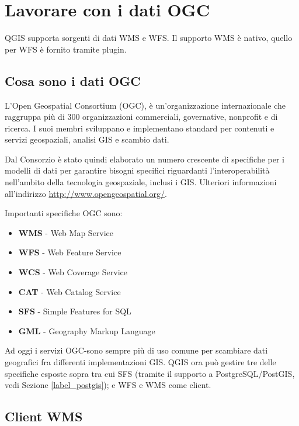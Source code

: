 
\section{Lavorare con i dati OGC}


QGIS supporta sorgenti di dati WMS e WFS. Il supporto WMS è nativo, quello per
WFS è fornito tramite plugin.

\subsection{Cosa sono i dati OGC}

L'Open Geospatial Consortium (OGC), è un’organizzazione internazionale che raggruppa più
di 300 organizzazioni commerciali, governative, nonprofit e di ricerca.
I suoi membri sviluppano e implementano standard per contenuti e servizi geospaziali,
analisi GIS e scambio dati.

Dal Consorzio è stato quindi elaborato un numero crescente di specifiche per i modelli di
dati per garantire bisogni specifici riguardanti l'interoperabilità
nell'ambito della tecnologia geospaziale, inclusi i GIS. Ulteriori
informazioni all'indirizzo \url{http://www.opengeospatial.org/}.

Importanti specifiche OGC sono:

\begin{itemize}
\item \textbf{WMS} - Web Map Service
\item \textbf{WFS} - Web Feature Service
\item \textbf{WCS} - Web Coverage Service
\item \textbf{CAT} - Web Catalog Service
\item \textbf{SFS} - Simple Features for SQL
\item \textbf{GML} - Geography Markup Language
\end{itemize}

Ad oggi i servizi OGC-sono sempre più di uso comune per scambiare dati geografici fra
differenti implementazioni GIS. QGIS ora può gestire tre delle specifiche esposte sopra
tra cui SFS (tramite il supporto a PostgreSQL/PostGIS, vedi Sezione
\ref{label_postgis}); e WFS e WMS come client.


\subsection{Client WMS}\label{sec:ogc-wms}

